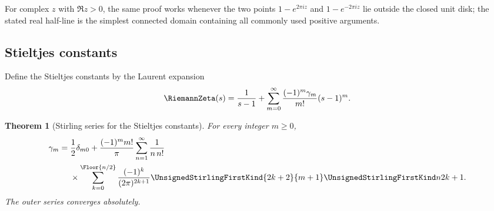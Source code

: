 \documentclass[11pt,a4paper,oneside,openany]{book}
\newtheorem{theorem}{Theorem}[chapter]
\theoremstyle{definition}
\theoremstyle{remark}
\begin{document}
For complex $z$ with $\Re z>0$, the same proof works whenever the two points
$1-e^{2\pi iz}$ and $1-e^{-2\pi iz}$ lie outside the closed unit disk; the stated
real half-line is the simplest connected domain containing all commonly used
positive arguments.

\subsection{Stieltjes constants}
Define the Stieltjes constants by the Laurent expansion
\begin{equation}
\label{eq:stieltjes-definition}
 \RiemannZeta(s)=\frac1{s-1}+\sum_{m=0}^{\infty}
 \frac{(-1)^m\gamma_m}{m!}(s-1)^m.
\end{equation}

\begin{theorem}[Stirling series for the Stieltjes constants]
\label{thm:stieltjes-stirling-series}
For every integer $m\ge0$,
\begin{equation}
\label{eq:stieltjes-stirling-series}
\begin{aligned}
 \gamma_m={}&\frac12\delta_{m0}
 +\frac{(-1)^m m!}{\pi}
 \sum_{n=1}^{\infty}\frac1{n\,n!}\\
 &\times\sum_{k=0}^{\Floor{n/2}}
 \frac{(-1)^k}{(2\pi)^{2k+1}}
 \UnsignedStirlingFirstKind{2k+2}{m+1}\UnsignedStirlingFirstKind n{2k+1}.
\end{aligned}
\end{equation}
The outer series converges absolutely.
\end{theorem}
\end{document}
